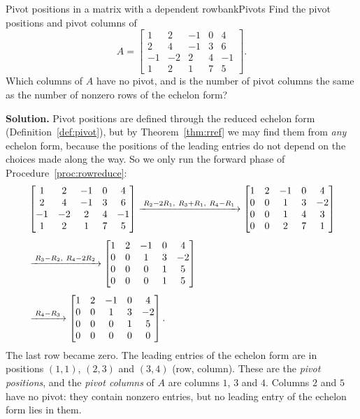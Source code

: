\documentclass[11pt]{article}
\begin{document}
\begin{exmp}{Pivot positions in a matrix with a dependent row}{bankPivots}
Find the pivot positions and pivot columns of
\[
A=\begin{bmatrix}1&2&-1&0&4\\2&4&-1&3&6\\-1&-2&2&4&-1\\1&2&1&7&5\end{bmatrix}.
\]
Which columns of $A$ have no pivot, and is the number of pivot columns the same as the number of nonzero rows of the echelon form?

\textbf{Solution.} Pivot positions are defined through the reduced echelon form (Definition~\ref{def:pivot}), but by Theorem~\ref{thm:rref} we may find them from \emph{any} echelon form, because the positions of the leading entries do not depend on the choices made along the way. So we only run the forward phase of Procedure~\ref{proc:rowreduce}:
\begin{align*}
&\begin{bmatrix}1&2&-1&0&4\\2&4&-1&3&6\\-1&-2&2&4&-1\\1&2&1&7&5\end{bmatrix}
\xrightarrow{\;R_2-2R_1,\ R_3+R_1,\ R_4-R_1\;}
\begin{bmatrix}1&2&-1&0&4\\0&0&1&3&-2\\0&0&1&4&3\\0&0&2&7&1\end{bmatrix}\\[4pt]
&
\xrightarrow{\;R_3-R_2,\ R_4-2R_2\;}
\begin{bmatrix}1&2&-1&0&4\\0&0&1&3&-2\\0&0&0&1&5\\0&0&0&1&5\end{bmatrix}\\[4pt]
&
\xrightarrow{\;R_4-R_3\;}
\begin{bmatrix}1&2&-1&0&4\\0&0&1&3&-2\\0&0&0&1&5\\0&0&0&0&0\end{bmatrix}.
\end{align*}
The last row became zero. The leading entries of the echelon form are in positions $(1,1)$, $(2,3)$ and $(3,4)$ (row, column). These are the \emph{pivot positions}, and the \emph{pivot columns} of $A$ are columns $1$, $3$ and $4$. Columns $2$ and $5$ have no pivot: they contain nonzero entries, but no leading entry of the echelon form lies in them.


\end{exmp}
\end{document}
